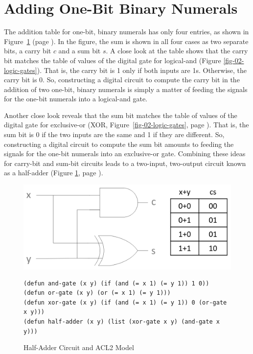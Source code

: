 \section{Adding One-Bit Binary Numerals}
\label{sec:adding-1-bit-numerals}

The addition table for one-bit, binary numerals
has only four entries, as shown in
Figure~\ref{fig:half-adder} (page \pageref{fig:half-adder}).
In the figure, the sum is shown in all four cases as two separate bits,
a carry bit $c$ and a sum bit $s$.
A close look at the table shows that
the carry bit matches the table of values of the
digital gate for logical-and (Figure \ref{fig-02-logic-gates}).
That is, the carry bit is 1 only if both inputs are 1s.
Otherwise, the carry bit is 0.
So, constructing a digital circuit to compute the carry bit
in the addition of two one-bit, binary numerals is simply
a matter of feeding the signals for the one-bit numerals
into a logical-and gate.

Another close look reveals that the sum bit
matches the table of values of the
digital gate for exclusive-or
(XOR, Figure~\ref{fig-02-logic-gates}, page \pageref{fig-02-logic-gates}).
That is, the sum bit is 0 if the two inputs are the same
and 1 if they are different.
So, constructing a digital circuit to compute the sum bit
amounts to feeding the signals for the one-bit numerals
into an exclusive-or gate.
Combining these ideas for carry-bit and sum-bit circuits
leads to a two-input, two-output circuit known as a
half-adder (Figure \ref{fig:half-adder}, page \pageref{fig:half-adder}).

\begin{figure}
\begin{center}
\includegraphics[scale=0.23]{Images/half-adder.png}
\begin{Verbatim}
(defun and-gate (x y) (if (and (= x 1) (= y 1)) 1 0))
(defun or-gate (x y) (or (= x 1) (= y 1)))
(defun xor-gate (x y) (if (and (= x 1) (= y 1)) 0 (or-gate x y)))
(defun half-adder (x y) (list (xor-gate x y) (and-gate x y)))
\end{Verbatim}
\end{center}
\caption{Half-Adder Circuit and ACL2 Model}
\label{fig:half-adder}
\end{figure}

